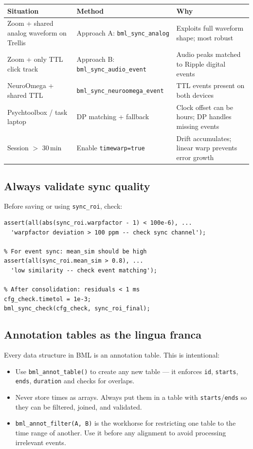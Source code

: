 \documentclass[11pt, a4paper]{article}
\begin{document}
\begin{center}
\begin{tabular}{L{4cm} L{4cm} L{5cm}}
\toprule
\textbf{Situation} & \textbf{Method} & \textbf{Why} \\
\midrule
Zoom + shared analog waveform on Trellis & Approach A: \texttt{bml\_sync\_analog} & Exploits full waveform shape; most robust \\
Zoom + only TTL click track & Approach B: \texttt{bml\_sync\_audio\_event} & Audio peaks matched to Ripple digital events \\
NeuroOmega + shared TTL & \texttt{bml\_sync\_neuroomega\_event} & TTL events present on both devices \\
Psychtoolbox / task laptop & DP matching + fallback & Clock offset can be hours; DP handles missing events \\
Session $>$ 30\,min & Enable \texttt{timewarp=true} & Drift accumulates; linear warp prevents error growth \\
\bottomrule
\end{tabular}
\end{center}

\subsection{Always validate sync quality}

Before saving or using \texttt{sync\_roi}, check:

\begin{lstlisting}[style=matlab]
% For analog sync: warpfactor should be very close to 1
assert(all(abs(sync_roi.warpfactor - 1) < 100e-6), ...
  'warpfactor deviation > 100 ppm -- check sync channel');

% For event sync: mean_sim should be high
assert(all(sync_roi.mean_sim > 0.8), ...
  'low similarity -- check event matching');

% After consolidation: residuals < 1 ms
cfg_check.timetol = 1e-3;
bml_sync_check(cfg_check, sync_roi_final);
\end{lstlisting}

\subsection{Annotation tables as the lingua franca}

Every data structure in BML is an annotation table. This is intentional:
\begin{itemize}
  \item Use \texttt{bml\_annot\_table()} to create any new table --- it enforces \texttt{id}, \texttt{starts}, \texttt{ends}, \texttt{duration} and checks for overlaps.
  \item Never store times as arrays. Always put them in a table with \texttt{starts}/\texttt{ends} so they can be filtered, joined, and validated.
  \item \texttt{bml\_annot\_filter(A, B)} is the workhorse for restricting one table to the time range of another. Use it before any alignment to avoid processing irrelevant events.
\end{itemize}
\end{document}
